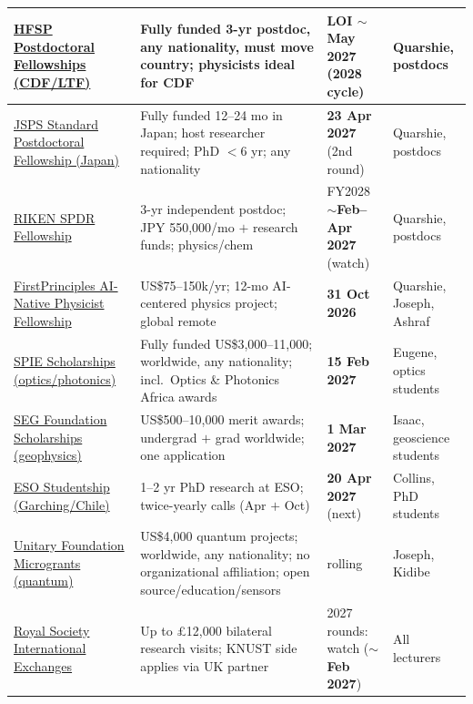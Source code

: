 \documentclass[11pt,a4paper]{article}
\begin{document}
\begin{longtable}{@{}p{3.4cm}p{5.6cm}p{2.2cm}p{2.7cm}@{}}
\midrule
\href{https://www.hfsp.org/funding/hfsp-funding/postdoctoral-fellowships}{HFSP Postdoctoral Fellowships (CDF/LTF)} & Fully funded 3-yr postdoc, any nationality, must move country; physicists ideal for CDF & LOI $\sim$\textbf{May 2027} (2028 cycle) & Quarshie, postdocs \\
\midrule
\href{https://www.jsps.go.jp/english/e-fellow/e-ippan/appliguidelines.html}{JSPS Standard Postdoctoral Fellowship (Japan)} & Fully funded 12--24 mo in Japan; host researcher required; PhD $<$6 yr; any nationality & \textbf{23 Apr 2027} (2nd round) & Quarshie, postdocs \\
\midrule
\href{https://www.riken.jp/en/careers/programs/spdr}{RIKEN SPDR Fellowship} & 3-yr independent postdoc; JPY 550{,}000/mo $+$ research funds; physics/chem & FY2028 $\sim$\textbf{Feb--Apr 2027} (watch) & Quarshie, postdocs \\
\midrule
\href{https://www.firstprinciplesfoundation.org/programs}{FirstPrinciples AI-Native Physicist Fellowship} & US\$75--150k/yr; 12-mo AI-centered physics project; global remote & \textbf{31 Oct 2026} & Quarshie, Joseph, Ashraf \\
\midrule
\href{https://spie.org/membership/student-hub/scholarships/optics-and-photonics-education-scholarships}{SPIE Scholarships (optics/photonics)} & Fully funded US\$3{,}000--11{,}000; worldwide, any nationality; incl.\ Optics \& Photonics Africa awards & \textbf{15 Feb 2027} & Eugene, optics students \\
\midrule
\href{https://seg.org/programs/student-programs/scholarships/}{SEG Foundation Scholarships (geophysics)} & US\$500--10{,}000 merit awards; undergrad $+$ grad worldwide; one application & \textbf{1 Mar 2027} & Isaac, geoscience students \\
\midrule
\href{http://www.hq.eso.org/sci/activities/fellowships-and-studentships/FeSt-overview.html}{ESO Studentship (Garching/Chile)} & 1--2 yr PhD research at ESO; twice-yearly calls (Apr $+$ Oct) & \textbf{20 Apr 2027} (next) & Collins, PhD students \\
\midrule
\href{https://unitary.foundation/grants}{Unitary Foundation Microgrants (quantum)} & US\$4{,}000 quantum projects; worldwide, any nationality; no organizational affiliation; open source/education/sensors & rolling & Joseph, Kidibe \\
\midrule
\href{https://royalsociety.org/grants/international-exchanges}{Royal Society International Exchanges} & Up to \pounds12{,}000 bilateral research visits; KNUST side applies via UK partner & 2027 rounds: watch ($\sim$\textbf{Feb 2027}) & All lecturers \\
\midrule


\end{longtable}
\end{document}
